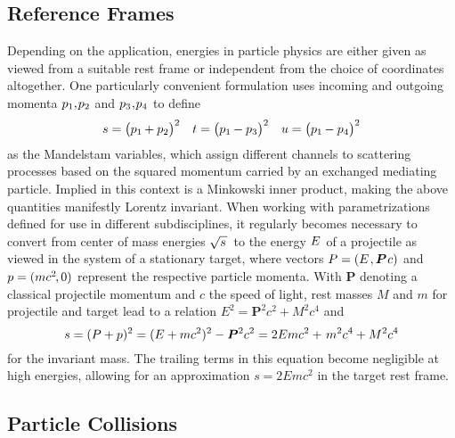 \subsection{Reference Frames}
\label{sub:frames}

Depending on the application, energies in particle physics are either given as viewed from a suitable rest frame or independent from
the choice of coordinates altogether. One particularly convenient formulation uses incoming and outgoing momenta
$p_1 , \kern-1.0pt p_2$ and $p_3 \kern+0.5pt , \kern-1.0pt p_4$ to define
\begin{align*}
	s = \bigl( p_1 \kern-0.5pt + p_2 \bigr)^2 &&
	t = \bigl( p_1 \kern-0.5pt - p_3 \bigr)^2 &&
	u = \bigl( p_1 \kern-0.5pt - p_4 \bigr)^2
\end{align*}
as the Mandelstam variables, which assign different channels to scattering processes based on the squared momentum carried by an
exchanged mediating particle. Implied in this context is a Minkowski inner product, making the above quantities manifestly Lorentz
invariant. When working with parametrizations defined for use in different subdisciplines, it regularly becomes necessary to convert
from center of mass energies $\sqrt{s \kern+1.0pt} \kern+1.0pt$ to the energy $\kern-0.5pt E \kern+1.0pt$ of a projectile as viewed
in the system of a stationary target, where vectors $P = (E \kern+1.0pt , \bm{P} \kern+0.75pt c)$ and $p = (m c^2 \kern-1.0pt , 0)$
represent the respective particle momenta. With $\bm{P}$ denoting a classical projectile momentum and $c$ the speed of light,
rest masses $M$ and $m$ for projectile and target lead to a relation $E^2 = \bm{P}^2 c^2 + M^2 c^4$ and
\begin{equation*}
	s = (P + p)^2 = (E + m c^2)^2 - \bm{P}^2 c^2 = 2E m c^2 + \kern+1.0pt m^2 c^4 + M^2 c^4
\end{equation*}
for the invariant mass. The trailing terms in this equation become negligible at high energies, allowing for an approximation
$s = 2E m c^2$ in the target rest frame.



\subsection{Particle Collisions}
\label{sub:collisions}

